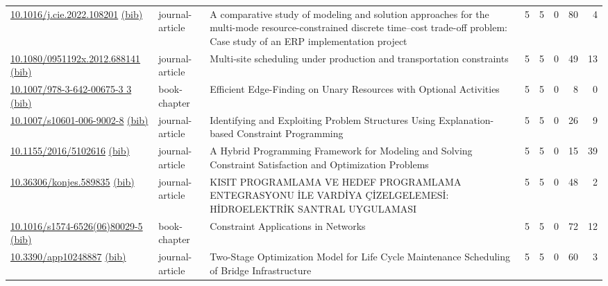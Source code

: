 {\begin{longtable}{p{5cm}lp{11cm}rrrrr}
\href{http://dx.doi.org/10.1016/j.cie.2022.108201}{10.1016/j.cie.2022.108201} \href{https://www.doi2bib.org/bib/10.1016/j.cie.2022.108201}{(bib)} & journal-article & A comparative study of modeling and solution approaches for the multi-mode resource-constrained discrete time–cost trade-off problem: Case study of an ERP implementation project & 5 & 5 & 0 & 80 & 4 \\
\href{http://dx.doi.org/10.1080/0951192x.2012.688141}{10.1080/0951192x.2012.688141} \href{https://www.doi2bib.org/bib/10.1080/0951192x.2012.688141}{(bib)} & journal-article & Multi-site scheduling under production and transportation constraints & 5 & 5 & 0 & 49 & 13 \\
\href{http://dx.doi.org/10.1007/978-3-642-00675-3_3}{10.1007/978-3-642-00675-3 3} \href{https://www.doi2bib.org/bib/10.1007/978-3-642-00675-3_3}{(bib)} & book-chapter & Efficient Edge-Finding on Unary Resources with Optional Activities & 5 & 5 & 0 & 8 & 0 \\
\href{http://dx.doi.org/10.1007/s10601-006-9002-8}{10.1007/s10601-006-9002-8} \href{https://www.doi2bib.org/bib/10.1007/s10601-006-9002-8}{(bib)} & journal-article & Identifying and Exploiting Problem Structures Using Explanation-based Constraint Programming & 5 & 5 & 0 & 26 & 9 \\
\href{http://dx.doi.org/10.1155/2016/5102616}{10.1155/2016/5102616} \href{https://www.doi2bib.org/bib/10.1155/2016/5102616}{(bib)} & journal-article & A Hybrid Programming Framework for Modeling and Solving Constraint Satisfaction and Optimization Problems & 5 & 5 & 0 & 15 & 39 \\
\href{http://dx.doi.org/10.36306/konjes.589835}{10.36306/konjes.589835} \href{https://www.doi2bib.org/bib/10.36306/konjes.589835}{(bib)} & journal-article & KISIT PROGRAMLAMA VE HEDEF PROGRAMLAMA ENTEGRASYONU İLE VARDİYA ÇİZELGELEMESİ: HİDROELEKTRİK SANTRAL UYGULAMASI & 5 & 5 & 0 & 48 & 2 \\
\href{http://dx.doi.org/10.1016/s1574-6526(06)80029-5}{10.1016/s1574-6526(06)80029-5} \href{https://www.doi2bib.org/bib/10.1016/s1574-6526(06)80029-5}{(bib)} & book-chapter & Constraint Applications in Networks & 5 & 5 & 0 & 72 & 12 \\
\href{http://dx.doi.org/10.3390/app10248887}{10.3390/app10248887} \href{https://www.doi2bib.org/bib/10.3390/app10248887}{(bib)} & journal-article & Two-Stage Optimization Model for Life Cycle Maintenance Scheduling of Bridge Infrastructure & 5 & 5 & 0 & 60 & 3 \\
\end{longtable}
}

